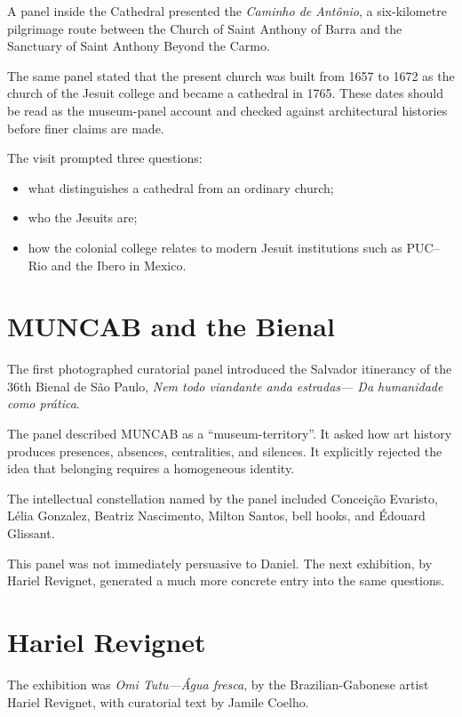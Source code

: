 A panel inside the Cathedral presented the
\emph{Caminho de Ant\^onio}, a six-kilometre
pilgrimage route between the Church of
Saint Anthony of Barra and the Sanctuary
of Saint Anthony Beyond the Carmo.

The same panel stated that the present
church was built from 1657 to 1672 as the
church of the Jesuit college and became a
cathedral in 1765.  These dates should be
read as the museum-panel account and
checked against architectural histories
before finer claims are made.

The visit prompted three questions:

\begin{itemize}
\item what distinguishes a cathedral from
an ordinary church;
\item who the Jesuits are;
\item how the colonial college relates to
modern Jesuit institutions such as
PUC--Rio and the Ibero in Mexico.
\end{itemize}

\section{MUNCAB and the Bienal}

The first photographed curatorial panel
introduced the Salvador itinerancy of the
36th Bienal de S\~ao Paulo,
\emph{Nem todo viandante anda estradas---
Da humanidade como pr\'atica}.

The panel described MUNCAB as a
``museum-territory''.  It asked how art
history produces presences, absences,
centralities, and silences.  It explicitly
rejected the idea that belonging requires
a homogeneous identity.

The intellectual constellation named by
the panel included Concei\c{c}\~ao Evaristo,
L\'elia Gonzalez, Beatriz Nascimento,
Milton Santos, bell hooks, and
\'Edouard Glissant.

This panel was not immediately persuasive
to Daniel.  The next exhibition, by Hariel
Revignet, generated a much more concrete
entry into the same questions.

\section{Hariel Revignet}

The exhibition was
\emph{Omi Tutu---\'Agua fresca}, by the
Brazilian-Gabonese artist Hariel Revignet,
with curatorial text by Jamile Coelho.

